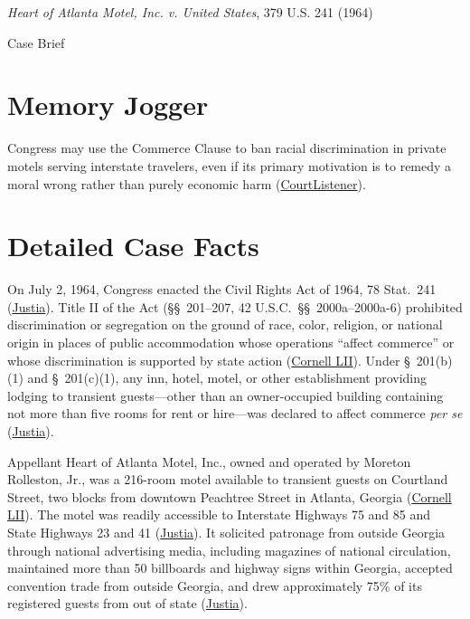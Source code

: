 \documentclass[12pt]{article}
\begin{document}
\begin{center}
{\LARGE \textit{Heart of Atlanta Motel, Inc. v. United States}, 379 U.S. 241 (1964)\par}
\vspace{0.8em}
{\large Case Brief\par}
\end{center}
\vspace{1em}

\section{Memory Jogger}
Congress may use the Commerce Clause to ban racial discrimination in private motels serving interstate travelers, even if its primary motivation is to remedy a moral wrong rather than purely economic harm (\href{https://www.courtlistener.com/opinion/106950/heart-of-atlanta-motel-inc-v-united-states/}{CourtListener}).

\section{Detailed Case Facts}
On July 2, 1964, Congress enacted the Civil Rights Act of 1964, 78 Stat.\ 241 (\href{https://supreme.justia.com/cases/federal/us/379/241/}{Justia}). Title II of the Act (\S\S~201--207, 42 U.S.C.\ \S\S~2000a--2000a-6) prohibited discrimination or segregation on the ground of race, color, religion, or national origin in places of public accommodation whose operations ``affect commerce'' or whose discrimination is supported by state action (\href{https://www.law.cornell.edu/supremecourt/text/379/241}{Cornell LII}). Under \S~201(b)(1) and \S~201(c)(1), any inn, hotel, motel, or other establishment providing lodging to transient guests---other than an owner-occupied building containing not more than five rooms for rent or hire---was declared to affect commerce \textit{per se} (\href{https://supreme.justia.com/cases/federal/us/379/241/}{Justia}).

Appellant Heart of Atlanta Motel, Inc., owned and operated by Moreton Rolleston, Jr., was a 216-room motel available to transient guests on Courtland Street, two blocks from downtown Peachtree Street in Atlanta, Georgia (\href{https://www.law.cornell.edu/supremecourt/text/379/241}{Cornell LII}). The motel was readily accessible to Interstate Highways 75 and 85 and State Highways 23 and 41 (\href{https://supreme.justia.com/cases/federal/us/379/241/}{Justia}). It solicited patronage from outside Georgia through national advertising media, including magazines of national circulation, maintained more than 50 billboards and highway signs within Georgia, accepted convention trade from outside Georgia, and drew approximately 75\% of its registered guests from out of state (\href{https://supreme.justia.com/cases/federal/us/379/241/}{Justia}).
\end{document}
